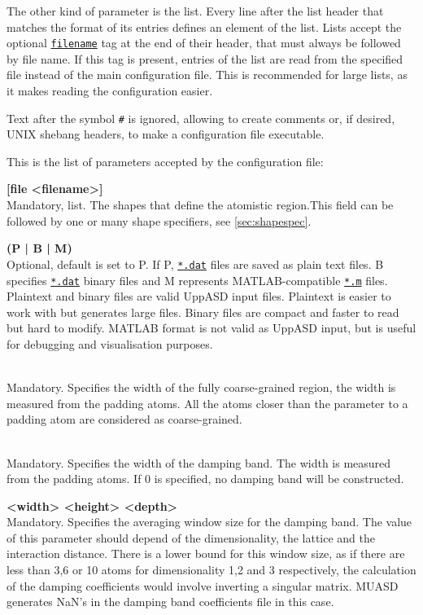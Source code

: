 \documentclass[11pt,fleqn,a4]{book} %
\makeatletter
\newcommand{\litem}[1]{\item[\bfseries#1\index{#1@\texttt{#1}}\label{#1}]}
\newcommand{\keyword}[1]{\hyperref[#1]{\texttt{#1}}\index{#1@\texttt{#1}}\label{#1}}
\newcommand{\rfilename}[1]{\hyperref[#1]{\texttt{#1}}}
\makeatother
\begin{document}
The other kind of parameter is the list. Every line after the list header that matches the format of its entries defines an element of the list.
Lists accept the optional \keyword{filename} tag at the end of their header, that must always be followed by file name.
If this tag is present, entries of the list are read from the specified file instead of the main configuration file.
This is recommended for large lists, as it makes reading the configuration easier.

Text after the symbol \verb|#| is ignored, allowing to create comments or, if desired, UNIX shebang headers, to make a configuration file executable.

This is the list of parameters accepted by the configuration file:
\begin{description}[leftmargin=!,labelwidth=\widthof{\bfseries 9999}]
%
\litem{atomistic_shape} {\bf [file <filename>]}  \\Mandatory, list. The shapes that define the atomistic region.This field can be followed by one or many shape specifiers, see \autoref{sec:shapespec}.
\litem{format} {\bf(P | B | M)}   \label{kw:format} \\Optional, default is set to P. If P, \rfilename{*.dat} files are saved as plain text files. B specifies \rfilename{*.dat} binary files and M represents MATLAB-compatible \rfilename{*.m} files. Plaintext and binary files are valid UppASD input files. Plaintext is easier to work with but generates large files. Binary files are compact and faster to read but hard to modify. MATLAB format is not valid as UppASD input, but is useful for debugging and visualisation purposes. 
%  
\litem{coarse_grained_width} {\bf <nonnegative real>}  \\ Mandatory. Specifies the width of the fully coarse-grained region, the width is measured from the padding atoms. All the atoms closer than the parameter to a padding atom are considered as coarse-grained.
%  
\litem{damping_band_width} {\bf <positive real>}   \\Mandatory. Specifies the width of the damping band. The width is measured from the padding atoms. If 0 is specified, no damping band will be constructed.
\litem{damping_band_window_size} {\bf<width> <height> <depth>}  \\ Mandatory. Specifies the averaging window size for the damping band. The value of this parameter should depend of the dimensionality, the lattice and the interaction distance. There is a lower bound for this window size, as if there are less than 3,6 or 10 atoms for dimensionality 1,2 and 3 respectively, the calculation of the damping coefficients would involve inverting a singular matrix. MUASD generates NaN's in the damping band coefficients file in this case.

\end{description}
\end{document}
